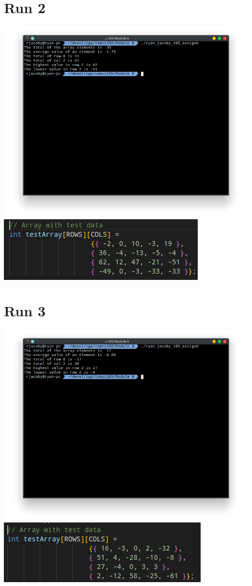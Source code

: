 \documentclass[letterpaper, 11pt]{article}
\begin{document}
\section*{Run 2}
\includegraphics[scale=0.5]{run2_1.png} \\
\includegraphics[scale=0.5]{run2_2.png}

\section*{Run 3}
\includegraphics[scale=0.5]{run3_1.png} \\
\includegraphics[scale=0.5]{run3_2.png}
\end{document}
